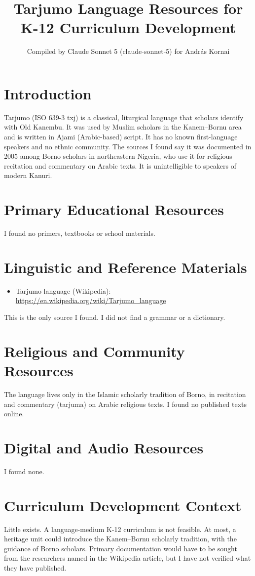 \documentclass[12pt]{article}
\title{Tarjumo Language Resources for K-12 Curriculum Development}
\author{Compiled by Claude Sonnet 5 (claude-sonnet-5) for Andr\'as Kornai}
\date{}
\begin{document}
\maketitle

\section{Introduction}
Tarjumo (ISO 639-3 txj) is a classical, liturgical language that scholars identify with Old Kanembu. It was used by Muslim scholars in the Kanem--Bornu area and is written in Ajami (Arabic-based) script. It has no known first-language speakers and no ethnic community. The sources I found say it was documented in 2005 among Borno scholars in northeastern Nigeria, who use it for religious recitation and commentary on Arabic texts. It is unintelligible to speakers of modern Kanuri.

\section{Primary Educational Resources}
I found no primers, textbooks or school materials.

\section{Linguistic and Reference Materials}
\begin{itemize}
\item Tarjumo language (Wikipedia): \url{https://en.wikipedia.org/wiki/Tarjumo_language}
\end{itemize}
This is the only source I found. I did not find a grammar or a dictionary.

\section{Religious and Community Resources}
The language lives only in the Islamic scholarly tradition of Borno, in recitation and commentary (tarjuma) on Arabic religious texts. I found no published texts online.

\section{Digital and Audio Resources}
I found none.

\section{Curriculum Development Context}
Little exists. A language-medium K-12 curriculum is not feasible. At most, a heritage unit could introduce the Kanem--Bornu scholarly tradition, with the guidance of Borno scholars. Primary documentation would have to be sought from the researchers named in the Wikipedia article, but I have not verified what they have published.
\end{document}
